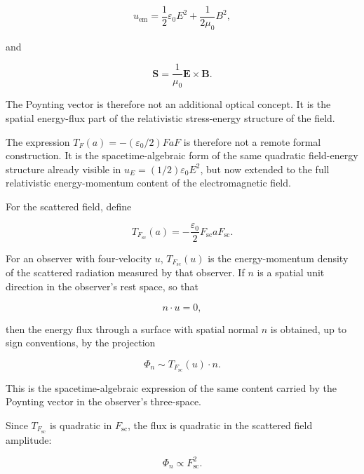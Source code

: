 \documentclass[11pt,a4paper]{article}
\begin{document}
\begin{equation}
u_{\mathrm{em}}
=
\frac{1}{2}\varepsilon_0 E^2
+
\frac{1}{2\mu_0}B^2,
\end{equation}

and

\begin{equation}
\mathbf{S}
=
\frac{1}{\mu_0}\mathbf{E}\times\mathbf{B}.
\end{equation}

The Poynting vector is therefore not an additional optical concept. It is the
spatial energy-flux part of the relativistic stress-energy structure of the
field.

The expression \(T_F(a)=-(\varepsilon_0/2)FaF\) is therefore not a remote
formal construction. It is the spacetime-algebraic form of the same quadratic
field-energy structure already visible in \(u_E=(1/2)\varepsilon_0 E^2\), but
now extended to the full relativistic energy-momentum content of the
electromagnetic field.

For the scattered field, define

\begin{equation}
T_{F_{\mathrm{sc}}}(a)
=
-\frac{\varepsilon_0}{2}
F_{\mathrm{sc}}aF_{\mathrm{sc}}.
\end{equation}

For an observer with four-velocity \(u\),
\(T_{F_{\mathrm{sc}}}(u)\) is the energy-momentum density of the scattered
radiation measured by that observer. If \(n\) is a spatial unit direction in
the observer's rest space, so that

\begin{equation}
n\cdot u = 0,
\end{equation}

then the energy flux through a surface with spatial normal \(n\) is obtained,
up to sign conventions, by the projection

\begin{equation}
\Phi_n
\sim
T_{F_{\mathrm{sc}}}(u)\cdot n.
\end{equation}

This is the spacetime-algebraic expression of the same content carried by the
Poynting vector in the observer's three-space.

Since \(T_{F_{\mathrm{sc}}}\) is quadratic in \(F_{\mathrm{sc}}\), the flux is
quadratic in the scattered field amplitude:

\begin{equation}
\Phi_n \propto F_{\mathrm{sc}}^2.
\end{equation}
\end{document}
